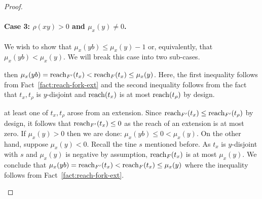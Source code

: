 \begin{proof}
\begin{description}[font=\normalfont\itshape\space]
    \end{description}



  \paragraph{Case 3: $\rho(xy)>0$ and $\mu_x(y)\neq0$.}
    We wish to show that $\mu_x(yb) \leq \mu_x(y) - 1$ 
    or, equivalently, that $\mu_x(yb) < \mu_x(y)$. 
    We will break this case into two sub-cases. 
    \begin{description}[font=\normalfont\itshape\space]
      \item[If both $t_\rho, t_x \in F$,] 
      then $\mu_x(yb) = \operatorname{reach}_{F'}(t_x) < \operatorname{reach}_{F}(t_x) \leq \mu_x(y)$. 
      Here, the first inequality follows from Fact~\ref{fact:reach-fork-ext} 
      and the second inequality follows from the fact that 
      $t_x, t_\rho$ is $y$-disjoint and 
      $\operatorname{reach}(t_x)$ is at most $\operatorname{reach}(t_\rho)$ by design.

      \item[Otherwise,] 
      at least one of $t_x, t_\rho$ arose from an extension. 
      Since $\operatorname{reach}_{F'}(t_x) \leq \operatorname{reach}_{F'}(t_\rho)$ by design, 
      it follows that $\operatorname{reach}_{F'}(t_x) \leq 0$ 
      as the reach of an extension is at most zero.
      If $\mu_x(y) > 0$ then we are done: $\mu_x(yb) \leq 0 < \mu_x(y)$.  
      On the other hand, suppose $\mu_x(y) < 0$. 
      Recall the tine $s$ mentioned before.
      As $t_x$ is $y$-disjoint with $s$ and 
      $\mu_x(y)$ is negative by assumption, 
      $\operatorname{reach}_F(t_x)$ is at most $\mu_x(y)$. 
      We conclude that 
      $
      \mu_x(yb) = \operatorname{reach}_{F'}(t_x) 
      < \operatorname{reach}_F(t_x) 
      \leq \mu_x(y)
      $ 
      where the inequality follows from Fact~\ref{fact:reach-fork-ext}.




\end{description}
\end{proof}
